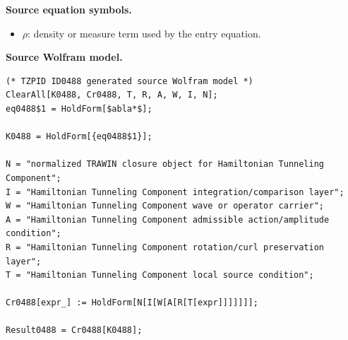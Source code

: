 \begin{minipage}[t]{0.49\linewidth}
\begingroup
\small
\raggedright
\textbf{Source equation symbols.}\par
\begin{itemize}[leftmargin=1.35em,itemsep=1pt,topsep=1pt,parsep=0pt]
    \item $\rho$: density or measure term used by the entry equation.
\end{itemize}
\endgroup
\end{minipage}\hfill
\begin{minipage}[t]{0.47\linewidth}
\begingroup
\scriptsize
\raggedright
\textbf{Source Wolfram model.}\par
\begin{Verbatim}[fontsize=\tiny,breaklines=true,breakanywhere=true]
(* TZPID ID0488 generated source Wolfram model *)
ClearAll[K0488, Cr0488, T, R, A, W, I, N];
eq0488$1 = HoldForm[$abla*$];

K0488 = HoldForm[{eq0488$1}];

N = "normalized TRAWIN closure object for Hamiltonian Tunneling Component";
I = "Hamiltonian Tunneling Component integration/comparison layer";
W = "Hamiltonian Tunneling Component wave or operator carrier";
A = "Hamiltonian Tunneling Component admissible action/amplitude condition";
R = "Hamiltonian Tunneling Component rotation/curl preservation layer";
T = "Hamiltonian Tunneling Component local source condition";

Cr0488[expr_] := HoldForm[N[I[W[A[R[T[expr]]]]]]];

Result0488 = Cr0488[K0488];
\end{Verbatim}
\endgroup
\end{minipage}

